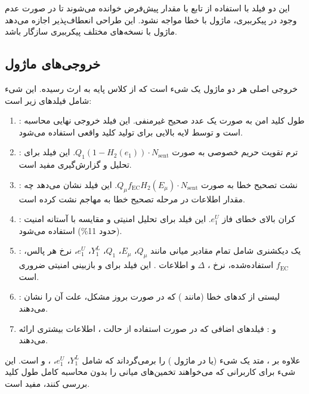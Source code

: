 این دو فیلد با استفاده از تابع  با مقدار پیش‌فرض خوانده می‌شوند تا در صورت عدم وجود در پیکرببری، ماژول با خطا مواجه نشود. این طراحی انعطاف‌پذیر اجازه می‌دهد ماژول با نسخه‌های مختلف پیکرببری سازگار باشد.

\subsection{خروجی‌های ماژول}

خروجی اصلی هر دو ماژول یک شیء  است که از کلاس پایه  به ارث رسیده. این شیء شامل فیلدهای زیر است:

\begin{enumerate}
	\item {}: طول کلید امن به صورت یک عدد صحیح غیرمنفی. این فیلد خروجی نهایی محاسبه است و توسط لایه بالایی برای تولید کلید واقعی استفاده می‌شود.
	\item {}: ترم تقویت حریم خصوصی به صورت $Q_1 (1 - H_2(e_1)) \cdot N_{\text{sent}}$. این فیلد برای تحلیل و گزارش‌گیری مفید است.
	\item {}: نشت تصحیح خطا به صورت $Q_\mu f_{\text{EC}} H_2(E_\mu) \cdot N_{\text{sent}}$. این فیلد نشان می‌دهد چه مقدار اطلاعات در مرحله تصحیح خطا به مهاجم نشت کرده است.
	\item {}: کران بالای خطای فاز $e_1^U$. این فیلد برای تحلیل امنیتی و مقایسه با آستانه امنیت  (حدود 11\%) استفاده می‌شود.
	\item {}: یک دیکشنری شامل تمام مقادیر میانی مانند $Q_\mu$، $E_\mu$، $Q_1$، $Y_1^L$، $e_1^U$، نرخ هر پالس، $f_{\text{EC}}$ استفاده‌شده، نرخ ، $\Delta$ و اطلاعات . این فیلد برای  و بازبینی امنیتی ضروری است.
	\item {}: لیستی از کدهای خطا (مانند ) که در صورت بروز مشکل، علت آن را نشان می‌دهند.
	\item {} و : فیلدهای اضافی که در صورت استفاده از حالت ، اطلاعات بیشتری ارائه می‌دهند.
\end{enumerate}

علاوه بر ، متد  یک شیء  (یا  در ماژول ) را برمی‌گرداند که شامل $Y_1^L$، $e_1^U$، ،  و  است. این شیء برای کاربرانی که می‌خواهند تخمین‌های میانی را بدون محاسبه کامل طول کلید بررسی کنند، مفید است.


